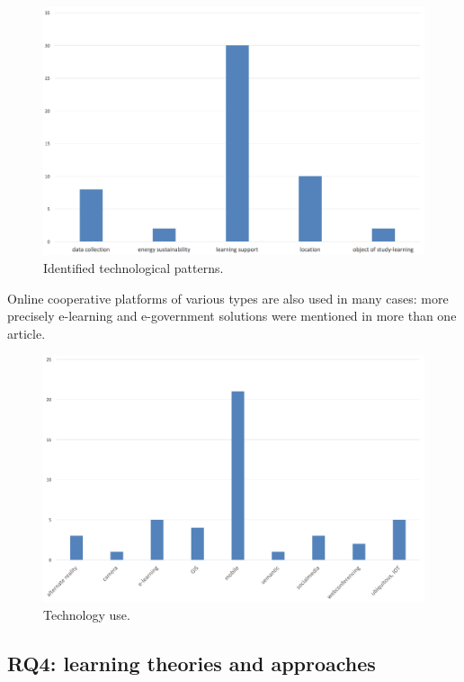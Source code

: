 \begin{figure}[htb]
\centering
\includegraphics[width=12cm]{img/technological_pattern}
\caption{Identified technological patterns.}
\label{fig:tech_patterns}
\end{figure}

Online cooperative platforms of various types are also used in many cases: more precisely e-learning\cite{schneider_location_2007}\cite{kabaka_elearning_2013} and e-government\cite{wong_prototype_2005}\cite{deakin_intelligent_2012} solutions were mentioned in more than one article.

\begin{figure}[htb]
\centering
\includegraphics[width=12cm]{img/technology}
\caption{Technology use.}
\label{fig:technology}
\end{figure}


\subsection*{RQ4: learning theories and approaches}

